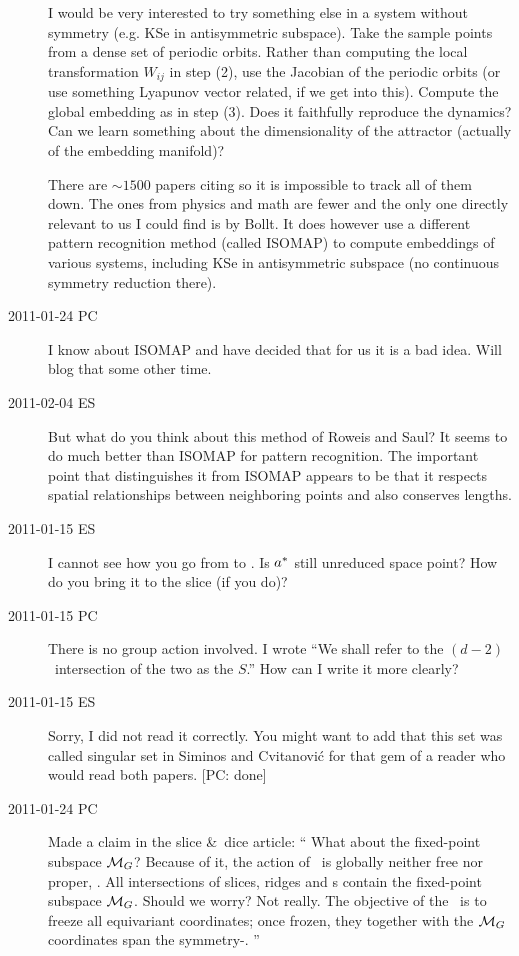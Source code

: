 \begin{description}
  I would be very interested to try something else in a system without symmetry
  (e.g. KSe in antisymmetric subspace). Take the sample points from a dense
  set of periodic orbits. Rather than computing the  local transformation
  $W_{ij}$ in step (2), use the Jacobian of the periodic orbits
  (or use something Lyapunov vector related, if we get into this).
  Compute the global embedding as in step (3). Does it faithfully reproduce
  the dynamics? Can we learn something about the dimensionality of
  the attractor (actually of the embedding manifold)?

  There are $\sim1500$ papers citing  so it is impossible to track
  all of them down. The ones from physics and math are fewer and the only one
  directly relevant to us I could find is by Bollt.
  It does however use a different pattern recognition method (called ISOMAP)
  to compute embeddings of various systems, including KSe in antisymmetric
  subspace (no continuous symmetry reduction there).

\item[2011-01-24 PC] I know about ISOMAP and have decided that for us
it is a bad idea. Will blog that some other time.

\item[2011-02-04 ES] But what do you think about this method of Roweis and
Saul? It seems to do much better than ISOMAP for pattern recognition.
The important point that distinguishes it from ISOMAP appears to be that
it respects spatial relationships between neighboring points and
also conserves lengths.

\item[2011-01-15 ES]
I cannot see how you go from  to .
Is $a^\ast$ still unreduced space point? How do you bring it to the
slice (if you do)?

\item[2011-01-15 PC] There is no group action involved. I wrote
``We shall refer to the $(d\!-\!2)$\dmn\ intersection of the two as the
{\em \sset} $S$.'' How can I write it more clearly?

\item[2011-01-15 ES] Sorry, I did not read it correctly. You might want to
add that this set was called singular set in
Siminos and Cvitanovi\'c for that gem of a reader who would
read both papers. [PC: done]

\item[2011-01-24 PC] Made a claim in the slice \&\ dice article:
``
What about the fixed-point subspace ${\cal M}_{G}$?
Because of it, the action of \Group\ is globally neither free nor proper,
\etc. All intersections of slices, ridges and {\chartBord s} contain the
fixed-point subspace ${\cal M}_{G}$. Should we worry? Not really. The
objective of the \mslices\ is to freeze all equivariant coordinates; once
frozen, they together with the  ${\cal M}_{G}$ coordinates span the
symmetry-\reducedsp.
''


\end{description}
